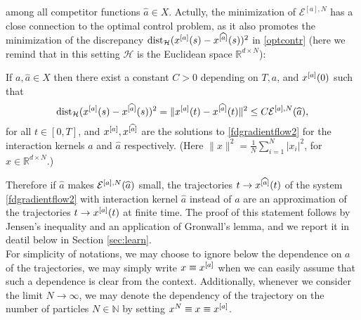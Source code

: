 among all competitor functions $\widehat a \in X$. 
Actully, the minimization of $\mathcal E^{[a],N}$ has a close connection to the optimal control problem, as it also promotes the minimization of the discrepancy $ \operatorname{dist}_{\mathcal H}(x^{[a]}(s) - x^{[\widehat a]}(s))^2$ in  \eqref{optcontr} (here we remind that in this setting $\mathcal H$ is the Euclidean space $\mathbb R^{d \times N}$):
\begin{proposition}\label{trajapprox}
If $a,\widehat a \in X$ then there exist a constant $C>0$ depending on $T, a$, and $x^{[a]}(0)$ such that
\begin{equation}\label{eq:trajapprox}
 \operatorname{dist}_{\mathcal H}(x^{[a]}(s) - x^{[\widehat a]}(s))^2= \| x^{[a]} (t) -x^{[\widehat a]}  (t) \|^2 \leq C {\mathcal E^{[a],N}(\widehat a)}, 
\end{equation}
for all $t \in [0,T]$, and $x^{[a]} , x^{[\widehat a]}  $ are the solutions to \eqref{fdgradientflow2} for the interaction kernels $a$ and $\widehat a$ respectively. (Here $\| x \|^2 = \frac{1}{N} \sum_{i=1}^N |x_i|^2$, for $x \in \mathbb R^{d \times N}$.)
\end{proposition}
Therefore if $\widehat a$ makes $\mathcal E^{[a],N}(\widehat a)$ small, the trajectories $t\to x^{[\widehat a]}(t)$ of the system \eqref{fdgradientflow2} with interaction kernel $\widehat a$ instead of $a$ are an approximation of the trajectories $t \to x^{[a]}(t)$ at finite time. 
The proof of this statement follows by Jensen's inequality and an application of Gronwall's lemma, and we report it in deatil below in Section \ref{sec:learn}. \\

 For simplicity of notations, we may choose to ignore below the dependence on $a$ of the trajectories, we may simply write $x \equiv x^{[a]}$ when we can easily assume that such a dependence  is clear from the context. Additionally, whenever we consider the limit $N \to \infty$,  we may denote the dependency of the trajectory on the number of particles $N \in \mathbb N$ by setting $x^N\equiv x \equiv x^{[a]}$.
\\

